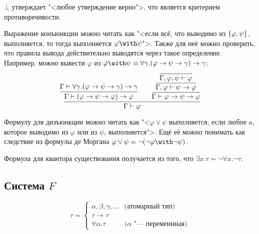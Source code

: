 $\bot$ утверждает "<любое утверждение верно">, что является критерием противоречивости.

Выражение конъюнкции можно читать как "<если всё, что выводимо из $\left\{\varphi,\psi\right\}$, выполняется,
то тогда выполняется $\varphi\with\psi$">.
Также для неё можно проверить, что правила вывода действительно выводятся через такое определение.
Например, можно вывести $\varphi$ из $\varphi\with\psi\equiv\forall\gamma.(\varphi\to\psi\to\gamma)\to\gamma$:
\[
    \infer{\Gamma \vdash \varphi}
    {
        \infer{\Gamma \vdash (\varphi\to\psi\to\varphi)\to\varphi}
            {\Gamma \vdash \forall \gamma.(\varphi\to\psi\to\gamma)\to\gamma}
        &&
        \infer{\Gamma\vdash\varphi\to\psi\to\varphi}
        {\infer{\Gamma,\varphi\vdash\psi\to\varphi}
        {\infer{\Gamma,\varphi,\psi\vdash\varphi}
        {}}}
    }
\]

Формулу для дизъюнкции можно читать как "<$\varphi \vee \psi$ выполняется,
если любое $a$, которое выводимо из $\varphi$ или из $\psi$, выполняется">.
Ещё её можно понимать как следствие из формулы де Моргана $\varphi\vee\psi=\neg(\neg\varphi\with\neg\psi)$.

Формула для квантора существования получается из того, что $\exists x . \tau = \neg \forall x . \neg \tau$.

\subsection{\texorpdfstring{Система $F$}{System F}}
\begin{definition}
\[
    \tau =
    \begin{cases}
        \alpha, \beta, \gamma, \ldots & \text{(атомарный тип)} \\
        \tau \to \tau \\
        \forall \alpha . \tau & \text{($\alpha$ "--- переменнная)}
    \end{cases}
\]
\end{definition}

